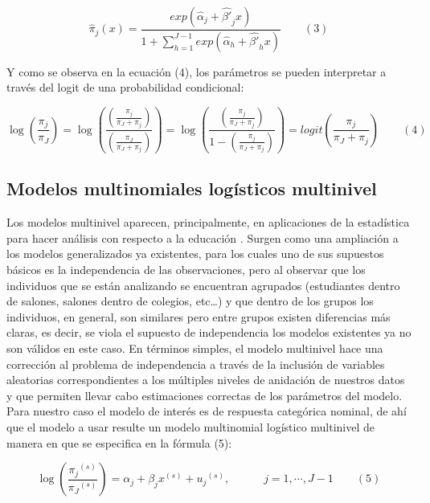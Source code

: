 \documentclass[]{article}
\theoremstyle{definition}
\theoremstyle{definition}
\theoremstyle{definition}
\theoremstyle{remark}
\begin{document}
\[{ \hat { \pi  }  }_{ j }(x)=\frac { exp({ \hat { \alpha  }  }_{ j }+{ \hat { \beta ' }  }_{ j }x) }{ 1+\sum _{ h=1 }^{ J-1 }{ exp({ \hat { \alpha  }  }_{ h }+{ \hat { \beta ' }  }_{ h }x) }  } \quad \quad (3)\]

Y como se observa en la ecuación (4), los parámetros se pueden
interpretar a través del logit de una probabilidad condicional:

\[\log { \left( \frac { { \pi  }_{ j } }{ { \pi  }_{ J } }  \right)  } =\log { \left( \frac { \left( \frac { { \pi  }_{ j } }{ { \pi  }_{ J }+{ \pi  }_{ j } }  \right)  }{ \left( \frac { { \pi  }_{ J } }{ { \pi  }_{ J }+{ \pi  }_{ j } }  \right)  }  \right)  } =\log { \left( \frac { \left( \frac { { \pi  }_{ j } }{ { \pi  }_{ J }+{ \pi  }_{ j } }  \right)  }{ 1-\left( \frac { { \pi  }_{ j } }{ { \pi  }_{ J }+{ \pi  }_{ j } }  \right)  }  \right)  } =logit\left( \frac { { \pi  }_{ j } }{ { \pi  }_{ J }+{ \pi  }_{ j } }  \right) \quad \quad (4)\]

\subsection{Modelos multinomiales logísticos
multinivel}\label{modelos-multinomiales-logisticos-multinivel}

Los modelos multinivel aparecen, principalmente, en aplicaciones de la
estadística para hacer análisis con respecto a la educación
\citep{Goldstein}. Surgen como una ampliación a los modelos
generalizados ya existentes, para los cuales uno de sus supuestos
básicos es la independencia de las observaciones, pero al observar que
los individuos que se están analizando se encuentran agrupados
(estudiantes dentro de salones, salones dentro de colegios, etc\ldots{})
y que dentro de los grupos los individuos, en general, son similares
pero entre grupos existen diferencias más claras, es decir, se viola el
supuesto de independencia los modelos existentes ya no son válidos en
este caso. En términos simples, el modelo multinivel hace una corrección
al problema de independencia a través de la inclusión de variables
aleatorias correspondientes a los múltiples niveles de anidación de
nuestros datos y que permiten llevar cabo estimaciones correctas de los
parámetros del modelo. Para nuestro caso el modelo de interés es de
respuesta categórica nominal, de ahí que el modelo a usar resulte un
modelo multinomial logístico multinivel \citep{Goldstein} de manera en
que se especifica en la fórmula (5):

\[\log { \left( \frac { { { \pi  }_{ j } }^{ (s) } }{ { { \pi  }_{ J } }^{ (s) } }  \right)  } ={ \alpha  }_{ j }+{ \beta  }_{ j }{ x }^{ (s) }+{ { u }_{ j } }^{ (s) },\quad \quad \quad j=1,\cdots ,J-1\quad \quad (5)\]
\end{document}
